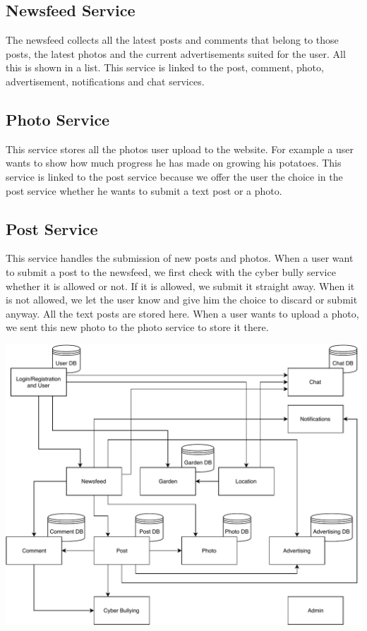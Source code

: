 \documentclass[a4paper,12pt]{article}
\begin{document}
\subsection{Newsfeed Service}

The newsfeed collects all the latest posts and comments that belong to those posts, the latest photos and the current advertisements suited for the user. All this is shown in a list. This service is linked to the post, comment, photo, advertisement, notifications and chat services.

\subsection{Photo Service}

This service stores all the photos user upload to the website. For example a user wants to show how much progress he has made on growing his potatoes. This service is linked to the post service because we offer the user the choice in the post service whether he wants to submit a text post or a photo.

\subsection{Post Service}

This service handles the submission of new posts and photos. When a user want to submit a post to the newsfeed, we first check with the cyber bully service whether it is allowed or not. If it is allowed, we submit it straight away. When it is not allowed, we let the user know and give him the choice to discard or submit anyway. All the text posts are stored here. When a user wants to upload a photo, we sent this new photo to the photo service to store it there.

\begin{adjustwidth}{-3cm}{}
\includegraphics[scale=1]{Microservices_architecture_final.pdf} 
\end{adjustwidth}
\end{document}
